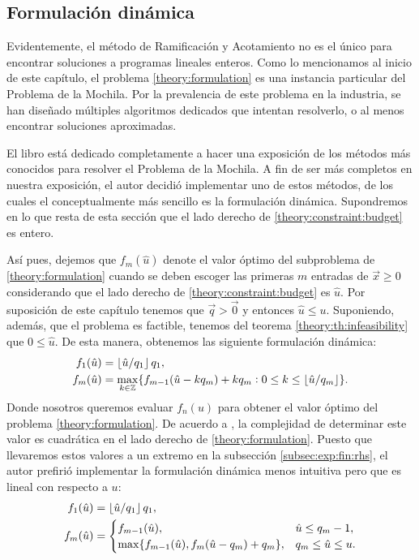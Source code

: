 \subsection{Formulación dinámica}
\noindent
Evidentemente, el método de Ramificación y Acotamiento no es el único para encontrar
soluciones a programas lineales enteros. Como lo mencionamos al inicio de este capítulo, el problema
\eqref{theory:formulation} es una instancia particular del Problema de la Mochila. Por la
prevalencia de este problema en la industria, se han diseñado múltiples algoritmos dedicados que
intentan resolverlo, o al menos encontrar soluciones aproximadas.

El libro \cite{martello} está dedicado completamente a hacer una exposición de los métodos más
conocidos para resolver el Problema de la Mochila. A fin de ser más completos en nuestra exposición,
el autor decidió implementar uno de estos métodos, de los cuales el conceptualmente más sencillo es
la formulación dinámica. Supondremos en lo que resta de esta sección que el lado
derecho de \eqref{theory:constraint:budget} es entero.

Así pues, dejemos que $f_m(\hat{u})$ denote el valor óptimo del subproblema de
\eqref{theory:formulation} cuando se deben escoger las primeras $m$ entradas de $\vec{x} \geq{0}$
considerando que el lado derecho de \eqref{theory:constraint:budget} es $\hat{u}$. Por
suposición de este capítulo tenemos que $\vec{q} > \vec{0}$ y entonces $\hat{u} \leq u$. Suponiendo,
además, que el problema es factible, tenemos del teorema \ref{theory:th:infeasibility} que $0 \leq
\hat{u}$.
De esta manera, obtenemos las siguiente formulación dinámica:
\begin{align*}
	f_1(\hat{u}) &= \left\lfloor \hat{u}/q_1 \right\rfloor q_1, \\
	f_m(\hat{u}) &= \max_{k \in \mathbb{Z}} \lbrace 
		f_{m-1}(\hat{u} - k q_m) + k q_m \vcentcolon 0 \leq k \leq \left\lfloor \hat{u}/q_m \right\rfloor
	 \rbrace.
\end{align*}
Donde nosotros queremos evaluar $f_n(u)$ para obtener el valor óptimo del problema
\eqref{theory:formulation}. De acuerdo a \cite{martello}, la complejidad de determinar este valor es
cuadrática en el lado derecho de \eqref{theory:formulation}. Puesto que llevaremos estos valores a
un extremo en la subsección \ref{subsec:exp:fin:rhs}, el autor prefirió implementar la formulación
dinámica menos intuitiva pero que es lineal con respecto a $u$:
\begin{subequations}
	\begin{align}
		\label{formulation:dp}
		f_1(\hat{u}) &= \left\lfloor \hat{u}/q_1 \right\rfloor q_1, \\
		f_m(\hat{u}) &= \begin{cases}
			f_{m-1}(\hat{u}), & \hat{u} \leq q_m - 1, \\
			\max\lbrace f_{m - 1}(\hat{u}), f_{m}(\hat{u} - q_m) + q_m \rbrace, & q_m \leq \hat{u} \leq u.
		\end{cases}
	\end{align}
\end{subequations}


